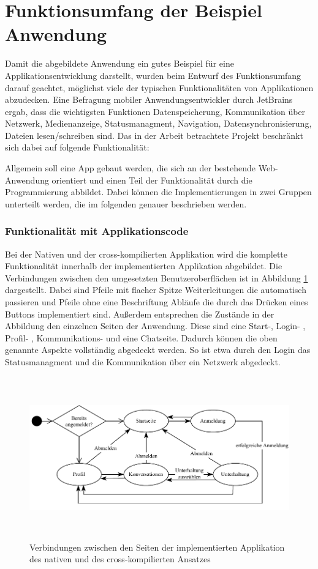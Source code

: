 \section{Funktionsumfang der Beispiel Anwendung}
Damit die abgebildete Anwendung ein gutes Beispiel für eine Applikationsentwicklung darstellt, wurden beim Entwurf des Funktionsumfang darauf geachtet, möglichst viele der typischen Funktionalitäten von Applikationen abzudecken. Eine Befragung \cite{JetBrains_miscellaneous_2021} mobiler Anwendungsentwickler durch JetBrains ergab, dass die wichtigsten Funktionen Datenspeicherung, Kommunikation über Netzwerk, Medienanzeige, Statusmanagment, Navigation, Datensynchronisierung, Dateien lesen/schreiben sind.
Das in der Arbeit betrachtete Projekt beschränkt sich dabei auf folgende Funktionalität:

Allgemein soll eine App gebaut werden, die sich an der bestehende Web-Anwendung orientiert und einen Teil der Funktionalität durch die Programmierung abbildet. Dabei können die Implementierungen in zwei Gruppen unterteilt werden, die im folgenden genauer beschrieben werden.

\subsubsection{Funktionalität mit Applikationscode}
Bei der Nativen und der cross-kompilierten Applikation wird die komplette Funktionalität innerhalb der implementierten Applikation abgebildet. Die Verbindungen zwischen den umgesetzten Benutzeroberflächen ist in Abbildung \ref{fig:pageflow} dargestellt. Dabei sind Pfeile mit flacher Spitze Weiterleitungen die automatisch passieren und Pfeile ohne eine Beschriftung Abläufe die durch das Drücken eines Buttons implementiert sind. Außerdem entsprechen die Zustände in der Abbildung den einzelnen Seiten der Anwendung. Diese sind eine Start-, Login- , Profil- , Kommunikations- und eine Chatseite. Dadurch können die oben genannte Aspekte vollständig abgedeckt werden. So ist etwa durch den Login das Statusmanagment und die Kommunikation über ein Netzwerk abgedeckt. 

\begin{figure}[ht]
  \centering
  \includegraphics[height=7cm,keepaspectratio]{images/Pageflow_native_flutter.drawio.pdf} 
  \caption[Seitenablauf der implemierten nativen und cross-kompilierten Applikation]{Verbindungen zwischen den Seiten der implementierten Applikation des nativen und des cross-kompilierten Ansatzes}
  \label{fig:pageflow}
\end{figure}

